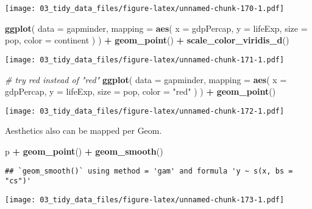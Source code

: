 \documentclass[
]{book}
\newenvironment{Shaded}{\begin{snugshade}}{\end{snugshade}}
\newcommand{\CommentTok}[1]{\textcolor[rgb]{0.56,0.35,0.01}{\textit{#1}}}
\newcommand{\DataTypeTok}[1]{\textcolor[rgb]{0.13,0.29,0.53}{#1}}
\newcommand{\KeywordTok}[1]{\textcolor[rgb]{0.13,0.29,0.53}{\textbf{#1}}}
\newcommand{\NormalTok}[1]{#1}
\newcommand{\OperatorTok}[1]{\textcolor[rgb]{0.81,0.36,0.00}{\textbf{#1}}}
\newcommand{\StringTok}[1]{\textcolor[rgb]{0.31,0.60,0.02}{#1}}
\begin{document}
\texttt{[image: 03\_tidy\_data\_files/figure-latex/unnamed-chunk-170-1.pdf]}

\begin{Shaded}
\begin{Highlighting}[]
\KeywordTok{ggplot}\NormalTok{(}
  \DataTypeTok{data =}\NormalTok{ gapminder,}
  \DataTypeTok{mapping =} \KeywordTok{aes}\NormalTok{(}
    \DataTypeTok{x =}\NormalTok{ gdpPercap, }\DataTypeTok{y =}\NormalTok{ lifeExp,}
    \DataTypeTok{size =}\NormalTok{ pop,}
    \DataTypeTok{color =}\NormalTok{ continent}
\NormalTok{  )}
\NormalTok{) }\OperatorTok{+}
\StringTok{  }\KeywordTok{geom\_point}\NormalTok{() }\OperatorTok{+}
\StringTok{  }\KeywordTok{scale\_color\_viridis\_d}\NormalTok{()}
\end{Highlighting}
\end{Shaded}

\texttt{[image: 03\_tidy\_data\_files/figure-latex/unnamed-chunk-171-1.pdf]}

\begin{Shaded}
\begin{Highlighting}[]
\CommentTok{\# try red instead of "red"}
\KeywordTok{ggplot}\NormalTok{(}
  \DataTypeTok{data =}\NormalTok{ gapminder,}
  \DataTypeTok{mapping =} \KeywordTok{aes}\NormalTok{(}
    \DataTypeTok{x =}\NormalTok{ gdpPercap, }\DataTypeTok{y =}\NormalTok{ lifeExp,}
    \DataTypeTok{size =}\NormalTok{ pop,}
    \DataTypeTok{color =} \StringTok{"red"}
\NormalTok{  )}
\NormalTok{) }\OperatorTok{+}
\StringTok{  }\KeywordTok{geom\_point}\NormalTok{()}
\end{Highlighting}
\end{Shaded}

\texttt{[image: 03\_tidy\_data\_files/figure-latex/unnamed-chunk-172-1.pdf]}

Aesthetics also can be mapped per Geom.

\begin{Shaded}
\begin{Highlighting}[]
\NormalTok{p }\OperatorTok{+}\StringTok{ }\KeywordTok{geom\_point}\NormalTok{() }\OperatorTok{+}
\StringTok{  }\KeywordTok{geom\_smooth}\NormalTok{()}
\end{Highlighting}
\end{Shaded}

\begin{verbatim}
## `geom_smooth()` using method = 'gam' and formula 'y ~ s(x, bs = "cs")'
\end{verbatim}

\texttt{[image: 03\_tidy\_data\_files/figure-latex/unnamed-chunk-173-1.pdf]}
\end{document}
